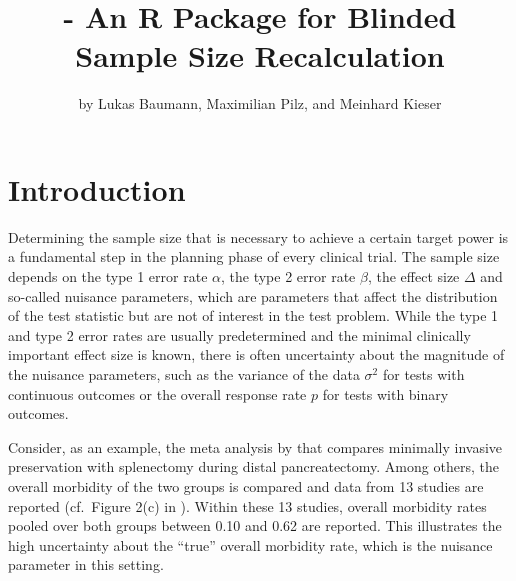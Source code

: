 \title{ - An R Package for Blinded Sample Size
Recalculation}
\author{by Lukas Baumann, Maximilian Pilz, and Meinhard Kieser}

\maketitle


\hypertarget{introduction}{%
\section{Introduction}\label{introduction}}

Determining the sample size that is necessary to achieve a certain
target power is a fundamental step in the planning phase of every
clinical trial. The sample size depends on the type 1 error rate
\(\alpha\), the type 2 error rate \(\beta\), the effect size \(\Delta\)
and so-called nuisance parameters, which are parameters that affect the
distribution of the test statistic but are not of interest in the test
problem. While the type 1 and type 2 error rates are usually
predetermined and the minimal clinically important effect size is known,
there is often uncertainty about the magnitude of the nuisance
parameters, such as the variance of the data \(\sigma^2\) for tests with
continuous outcomes or the overall response rate \(p\) for tests with
binary outcomes.

Consider, as an example, the meta analysis by \citet{Nakata} that
compares minimally invasive preservation with splenectomy during distal
pancreatectomy. Among others, the overall morbidity of the two groups is
compared and data from 13 studies are reported (cf.~Figure 2(c) in
\citet{Nakata}). Within these 13 studies, overall morbidity rates pooled
over both groups between 0.10 and 0.62 are reported. This illustrates
the high uncertainty about the ``true'' overall morbidity rate, which is
the nuisance parameter in this setting.

